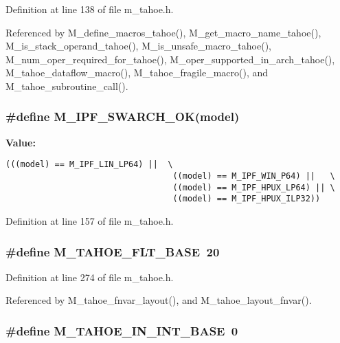 Definition at line 138 of file m\_\-tahoe.h.

Referenced by M\_\-define\_\-macros\_\-tahoe(), M\_\-get\_\-macro\_\-name\_\-tahoe(), M\_\-is\_\-stack\_\-operand\_\-tahoe(), M\_\-is\_\-unsafe\_\-macro\_\-tahoe(), M\_\-num\_\-oper\_\-required\_\-for\_\-tahoe(), M\_\-oper\_\-supported\_\-in\_\-arch\_\-tahoe(), M\_\-tahoe\_\-dataflow\_\-macro(), M\_\-tahoe\_\-fragile\_\-macro(), and M\_\-tahoe\_\-subroutine\_\-call().
\subsubsection{\setlength{\rightskip}{0pt plus 5cm}\#define M\_\-IPF\_\-SWARCH\_\-OK(model)}\label{m__tahoe_8h_b13e8afc930b0340d5779e1199d816a9}


\textbf{Value:}

\begin{Code}\begin{verbatim}(((model) == M_IPF_LIN_LP64) ||  \
                                  ((model) == M_IPF_WIN_P64) ||   \
                                  ((model) == M_IPF_HPUX_LP64) || \
                                  ((model) == M_IPF_HPUX_ILP32))
\end{verbatim}\end{Code}


Definition at line 157 of file m\_\-tahoe.h.
\subsubsection{\setlength{\rightskip}{0pt plus 5cm}\#define M\_\-TAHOE\_\-FLT\_\-BASE~20}\label{m__tahoe_8h_8c492f98a9fea3f58ec91b8f951a1e1e}




Definition at line 274 of file m\_\-tahoe.h.

Referenced by M\_\-tahoe\_\-fnvar\_\-layout(), and M\_\-tahoe\_\-layout\_\-fnvar().
\subsubsection{\setlength{\rightskip}{0pt plus 5cm}\#define M\_\-TAHOE\_\-IN\_\-INT\_\-BASE~0}\label{m__tahoe_8h_f697e1700a7b379bced6118a255f4cf2}




